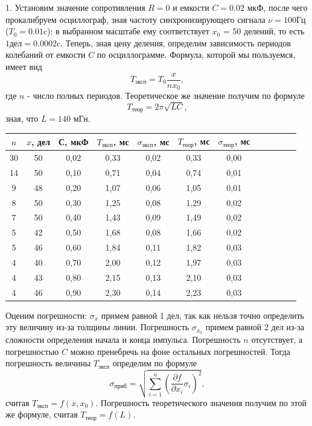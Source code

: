\documentclass[14pt]{article}
\begin{document}
\vspace{1cm}

1. Установим значение сопротивления $R = 0$ и емкости $C = 0.02$ мкФ, после чего прокалибруем осциллограф, зная частоту синхронизирующего сигнала $\nu = 100$Гц 
($T_0 = 0.01$c): в выбранном масштабе ему соответствует $x_0$ = 50 делений, то есть $1\text{дел} = 0.0002$c. Теперь, зная цену деления, определим зависимость периодов колебаний от емкости $C$ по осциллограмме. Формула, которой мы пользуемся, имеет вид
$$
	T_{\text{эксп}} = T_0\frac{x}{nx_0},
$$
\noindent где $n$ - число полных периодов. Теоретическое же значение получим по формуле
$$
	T_{\text{теор}} = 2\pi\sqrt{LC},
$$
\noindent зная, что $L = 140$ мГн.

\begin{center}
\begin{tabular}{|c|c|c|c|c|c|c|c|c|c|c|c|}
\hline
$n$&$x$, дел&С, мкФ&$T_{\text{эксп}}$, мс&$\sigma_{эксп}$, мс&$T_{\text{теор}}$, мс&$\sigma_{теор}$, мс\\
\hline
30&50&0,02&0,33&0,02&0,33&0,00\\
\hline
14&50&0,10&0,71&0,04&0,74&0,01\\
\hline
9&48&0,20&1,07&0,06&1,05&0,01\\
\hline
8&50&0,30&1,25&0,08&1,29&0,02\\
\hline
7&50&0,40&1,43&0,09&1,49&0,02\\
\hline
5&42&0,50&1,68&0,08&1,66&0,02\\
\hline
5&46&0,60&1,84&0,11&1,82&0,03\\
\hline
4&40&0,70&2,00&0,12&1,97&0,03\\
\hline
4&43&0,80&2,15&0,13&2,10&0,03\\
\hline
4&46&0,90&2,30&0,14&2,23&0,03\\
\hline
\end{tabular}

\end{center}

Оценим погрешности: $\sigma_x$ примем равной 1 дел, так как нельзя точно определить эту величину из-за толщины линии. Погрешность $\sigma_{x_0}$ примем равной 2 дел из-за сложности определения начала и конца импульса. Погрешность $n$ отсутствует, а погрешностью $C$ можно пренебречь на фоне остальных погрешностей. Тогда погрешность величины 
$T_{\text{эксп}}$ определим по формуле
$$
	\sigma_{приб} = \sqrt{\sum_{i = 1}^n \left(\frac{\partial f}{\partial x_i}\sigma_i\right)^2},
$$
\noindent считая $T_{\text{эксп}} = f(x, x_0)$. Погрешность теоретического значения получим по этой же формуле, считая $T_{\text{теор}} = f(L)$.
\end{document}
